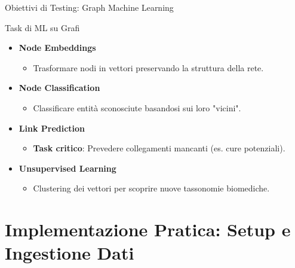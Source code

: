 \documentclass[aspectratio=169]{beamer}
\begin{document}
\begin{frame}{Obiettivi di Testing: Graph Machine Learning}
    \begin{block}{\faRobot \hspace{0.2cm} Task di ML su Grafi}
        \small
        \begin{itemize}
            \item[\faVectorSquare] \textbf{Node Embeddings}
            \begin{itemize}
                \scriptsize \item Trasformare nodi in vettori preservando la struttura della rete.
            \end{itemize}
            
            \item[\faTags] \textbf{Node Classification}
            \begin{itemize}
                \scriptsize \item Classificare entità sconosciute basandosi sui loro "vicini".
            \end{itemize}
            
            \item[\faMagic] \textbf{Link Prediction}
            \begin{itemize}
                \scriptsize \item \textbf{Task critico}: Prevedere collegamenti mancanti (es. cure potenziali).
            \end{itemize}
            
            \item[\faObjectGroup] \textbf{Unsupervised Learning}
            \begin{itemize}
                \scriptsize \item Clustering dei vettori per scoprire nuove tassonomie biomediche.
            \end{itemize}
        \end{itemize}
    \end{block}
\end{frame}

\section{Implementazione Pratica: Setup e Ingestione Dati}
\end{document}
